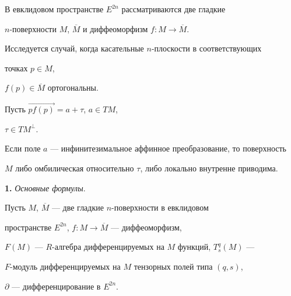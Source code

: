 


\pagestyle{plain} %


 


 




 


\maketitle 


\label{begin}


В евклидовом пространстве $E^{2n}$ рассматриваются две гладкие


$n$-поверхности $M$, $\overline M$ и диффеоморфизм $f:M\to \overline M$.


Исследуется случай, когда касательные $n$-плоскости в соответствующих


точках $p \in M $,


$f(p)\in\overline M$ ортогональны.


Пусть $\overrightarrow{pf(p)}=a+\tau$, $a\in TM$,


$\tau\in{TM}^{\bot}$.





                                   


\begin{thmnonum}


Если поле $a$ --- инфинитезимальное аффинное преобразование, то поверхность


$M$ либо омбилическая относительно $\tau$, либо локально внутренне приводима.


\end{thmnonum}





{\bf 1.} {\it Основные формулы}.


Пусть $M$, $\overline M$ --- две гладкие $n$-поверхности в евклидовом


пространстве $E^{2n}$, $f:M\to\overline M$ --- диффеоморфизм,


$F(M)$ --- $R$-алгебра дифференцируемых на $M$ функций, $T^{q}_{s}(M)$ ---


$F$-модуль дифференцируемых на $M$ тензорных полей типа $(q, s)$,


$\partial$ --- дифференцирование в $E^{2n}$.            





